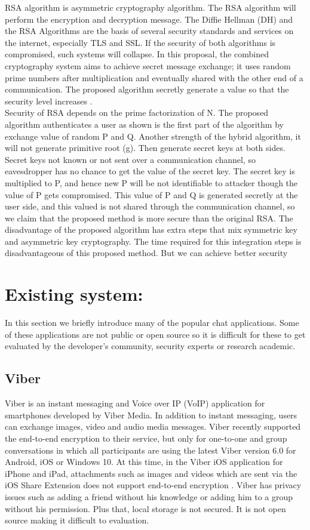 RSA algorithm is asymmetric cryptography algorithm. The RSA algorithm will perform the encryption and decryption message. The Diffie Hellman (DH) and the RSA Algorithms are the basis of several security standards and services on the internet, especially TLS and SSL. If the security of both algorithms is compromised, such systems will collapse. In this proposal, the combined cryptography system aims to achieve secret message exchange; it uses random prime numbers after multiplication and eventually shared with the other end of a communication. The proposed algorithm secretly generate a value so that the security level increases .\cite{mdh} \\
Security of RSA depends on the prime factorization of N. The proposed algorithm authenticates a user as shown is the first part of the algorithm by exchange value of random P and Q. Another strength of the hybrid algorithm, it will not generate primitive root (g). Then generate secret keys at both sides. Secret keys not known or not sent over a communication channel, so eavesdropper has no chance to get the value of the secret key. The secret key is multiplied to P, and hence new P will be not identifiable to attacker though the value of P gets compromised. This value of P and Q is generated secretly at the user side, and this valued is not shared through the communication channel, so we claim that the proposed method is more secure than the original RSA. The disadvantage of the proposed algorithm has extra steps that mix symmetric key and asymmetric key cryptography. The time required for this integration steps is disadvantageous of this proposed method. But we can achieve better security\cite{mdh}


\section{Existing system:}
In this section we briefly introduce many of the popular chat applications. Some of these applications are not public or open source so it is difficult for these to get evaluated by the developer’s community, security experts or research academic.

\subsection{Viber}
Viber is an instant messaging and Voice over IP (VoIP) application for smartphones developed by Viber Media. In addition to instant messaging, users can exchange images,
video and audio media messages. Viber recently supported the end-to-end encryption to their service, but only for one-to-one and group conversations in which all
participants are using the latest Viber version 6.0 for Android, iOS or Windows 10. At this time, in the Viber iOS application for iPhone and iPad, attachments such as images and videos which are sent via the iOS Share Extension does not support end-to-end encryption .\cite{shyam} Viber has privacy issues such as adding a friend without his knowledge or adding him to a group without his permission. Plus that, local storage is not secured. It is not
open source making it difficult to evaluation.

